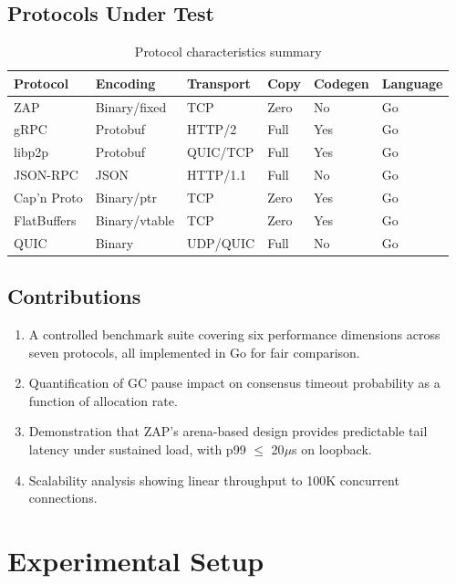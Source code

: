 \documentclass[11pt,letterpaper]{article}
\begin{document}
\subsection{Protocols Under Test}

\begin{table}[h]
\centering
\caption{Protocol characteristics summary}
\label{tab:protocols}
\begin{tabular}{llllll}
\toprule
\textbf{Protocol} & \textbf{Encoding} & \textbf{Transport} & \textbf{Copy} & \textbf{Codegen} & \textbf{Language} \\
\midrule
ZAP & Binary/fixed & TCP & Zero & No & Go \\
gRPC & Protobuf & HTTP/2 & Full & Yes & Go \\
libp2p & Protobuf & QUIC/TCP & Full & Yes & Go \\
JSON-RPC & JSON & HTTP/1.1 & Full & No & Go \\
Cap'n Proto & Binary/ptr & TCP & Zero & Yes & Go \\
FlatBuffers & Binary/vtable & TCP & Zero & Yes & Go \\
QUIC & Binary & UDP/QUIC & Full & No & Go \\
\bottomrule
\end{tabular}
\end{table}

\subsection{Contributions}

\begin{enumerate}
\item A controlled benchmark suite covering six performance dimensions across seven protocols, all implemented in Go for fair comparison.
\item Quantification of GC pause impact on consensus timeout probability as a function of allocation rate.
\item Demonstration that ZAP's arena-based design provides predictable tail latency under sustained load, with p99 $\leq$ 20$\mu$s on loopback.
\item Scalability analysis showing linear throughput to 100K concurrent connections.
\end{enumerate}

\section{Experimental Setup}
\end{document}
